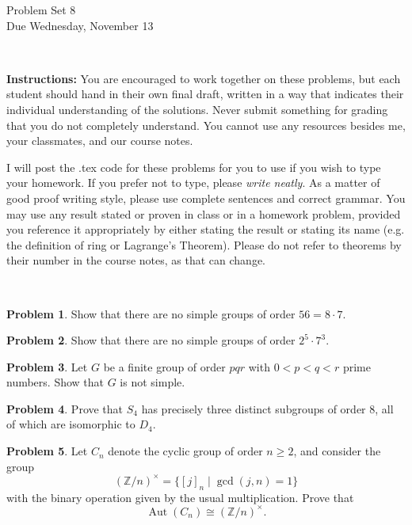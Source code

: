 \documentclass[11pt]{article}
\title{}
\date{\vspace{-0.5in}}
\DeclareMathOperator{\Aut}{Aut}
\newcommand{\ZZ}{\mathbb{Z}}
\theoremstyle{definition}
\newtheorem{problem}{Problem}
\begin{document}
\thispagestyle{fancy}
\pagestyle{fancy}

\vspace{3em}

\begin{center}
	{\LARGE Problem Set 8 \\}
	Due Wednesday, November 13
\end{center}

\

\noindent
{\bf Instructions:}
You are encouraged to work together on these problems, but each student should hand in their own final draft, written in a way that indicates their individual understanding of the solutions. Never submit something for grading that you do not completely understand. You cannot use any resources besides me, your classmates, and our course notes.


I will post the .tex code for these problems for you to use if you wish to type your homework. If you prefer not to type, please  {\em write neatly}. As a matter of good proof writing style, please use complete sentences and correct grammar. You may use any result  stated or proven in class or in a homework problem, provided you reference it appropriately by either stating the result or stating its name (e.g. the definition of ring or Lagrange's Theorem). Please do not refer to theorems by their number in the course notes, as that can change.


\

\begin{problem}
Show that there are no simple groups of order $56 = 8 \cdot 7$.
\end{problem}

\begin{problem}
	Show that there are no simple groups of order $2^5\cdot 7^3$. 
\end{problem}



\begin{problem}
	 Let $G$ be a finite group of order $pqr$ with $0<p < q < r$ prime numbers. Show that $G$ is not simple.
\end{problem}


\begin{problem}
Prove that $S_4$ has precisely three distinct subgroups of order $8$, all of which are isomorphic to $D_4$.	
\end{problem}




\begin{problem}
Let $C_n$ denote the cyclic group of order $n \geqslant 2$, and consider the group
$$(\ZZ/n)^\times = \{ [j]_n \mid \gcd(j,n)=1\}$$
with the binary operation given by the usual multiplication. Prove that 
$$\Aut(C_n) \cong (\ZZ/n)^\times.$$
\end{problem}
\end{document}

